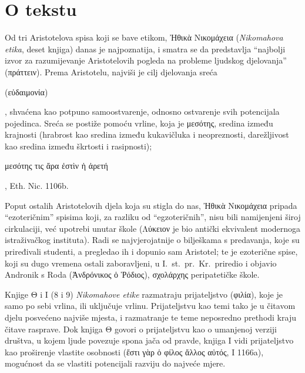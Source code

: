 


\section*{O tekstu}

Od tri Aristotelova spisa koji se bave etikom, Ἠθικὰ Νικομάχεια (\textit{Nikomahova etika}, deset knjiga) danas je najpoznatija, i smatra se da predstavlja ``najbolji izvor za razumijevanje Aristotelovih pogleda na probleme ljudskog djelovanja'' (πράττειν). Prema Aristotelu, najviši je cilj djelovanja sreća \begin{greek}(εὐδαιμονία)\end{greek}, shvaćena kao potpuno samoostvarenje, odnosno ostvarenje svih potencijala pojedinca. Sreća se postiže pomoću vrline, koja je μεσότης, sredina između krajnosti (hrabrost kao sredina između kukavičluka i neopreznosti, darežljivost kao sredina između škrtosti i rasipnosti); \begin{greek}μεσότης τις ἄρα ἐστὶν ἡ ἀρετή\end{greek}, Eth. Nic. 1106b.

Poput ostalih Aristotelovih djela koja su stigla do nas, Ἠθικὰ Νικομάχεια pripada ``ezoteričnim'' spisima koji, za razliku od ``egzoteričnih'', nisu bili namijenjeni široj cirkulaciji, već upotrebi unutar škole (Λύκειον je bio antički ekvivalent modernoga istraživačkog instituta). Radi se najvjerojatnije o bilješkama s predavanja, koje su priređivali studenti, a pregledao ih i dopunio sam Aristotel; te je ezoterične spise, koji su dugo vremena ostali zaboravljeni, u I.~st.\ pr.~Kr.\ priredio i objavio Andronik s Roda (Ἀνδρόνικος ὁ Ῥόδιος), σχολάρχης peripatetičke škole.

Knjige Θ i Ι (8 i 9) \textit{Nikomahove etike} razmatraju prijateljstvo (φιλία), koje je samo po sebi vrlina, ili uključuje vrlinu. Prijateljstvu kao temi tako je u čitavom djelu posvećeno najviše mjesta, i razmatranje te teme neposredno prethodi kraju čitave rasprave. Dok knjiga Θ govori o prijateljstvu kao o umanjenoj verziji društva, u kojem ljude povezuje spona jača od pravde, knjiga Ι vidi prijateljstvo kao proširenje vlastite osobnosti (ἔστι γὰρ ὁ φίλος ἄλλος αὐτός, Ι 1166a), mogućnost da se vlastiti potencijali razviju do najveće mjere.

